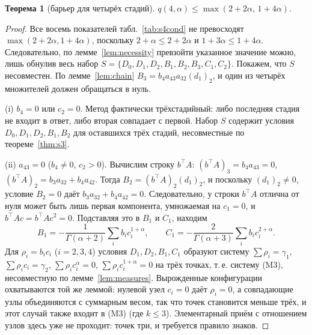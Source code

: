 \documentclass[11pt,a4paper]{article}
\theoremstyle{plain}
\newtheorem{theorem}{Теорема}
\theoremstyle{definition}
\newcommand{\G}{\Gamma}
\begin{document}
\begin{theorem}[барьер для четырёх стадий]\label{thm:s4}
$q(4,\alpha)\le\max(2+2\alpha,\,1+4\alpha)$.
\end{theorem}
\begin{proof}
Все восемь показателей табл.~\ref{tab:s4cond} не превосходят $\max(2+2\alpha,1+4\alpha)$, поскольку $2+\alpha\le2+2\alpha$ и $1+3\alpha\le1+4\alpha$. Следовательно, по лемме~\ref{lem:necessity} превзойти указанное значение можно, лишь обнулив весь набор $S=\{D_0,D_1,D_2,B_1,B_2,B_3,C_1,C_2\}$. Покажем, что $S$ несовместен. По лемме~\ref{lem:chain} $B_3=b_4a_{43}a_{32}(d_1)_2$, и один из четырёх множителей должен обращаться в нуль.

(i) $b_4=0$ или $c_2=0$. Метод фактически трёхстадийный: либо последняя стадия не входит в ответ, либо вторая совпадает с первой. Набор $S$ содержит условия $D_0,D_1,D_2,B_1,B_2$ для оставшихся трёх стадий, несовместные по теореме~\ref{thm:s3}.

(ii) $a_{43}=0$ ($b_4\ne0$, $c_2>0$). Вычислим строку $b^{\top}A$: $(b^{\top}A)_3=b_4a_{43}=0$, $(b^{\top}A)_2=b_3a_{32}+b_4a_{42}$. Тогда $B_2=(b^{\top}A)_2(d_1)_2$, и поскольку $(d_1)_2\neq0$, условие $B_2=0$ даёт $b_3a_{32}+b_4a_{42}=0$. Следовательно, у строки $b^{\top}A$ отлична от нуля может быть лишь первая компонента, умножаемая на $c_1=0$, и $b^{\top}Ac=b^{\top}Ac^2=0$. Подставляя это в $B_1$ и $C_1$, находим
\[
B_1=-\frac{1}{\G(\alpha+2)}\sum_ib_ic_i^{1+\alpha},\qquad C_1=-\frac{2}{\G(\alpha+3)}\sum_ib_ic_i^{2+\alpha}.
\]
Для $\rho_i=b_ic_i$ ($i=2,3,4$) условия $D_1,D_2,B_1,C_1$ образуют систему $\sum\rho_i=\gamma_1$, $\sum\rho_ic_i=\gamma_2$, $\sum\rho_ic_i^{\alpha}=0$, $\sum\rho_ic_i^{1+\alpha}=0$ на трёх точках, т.\,е. систему (M3), несовместную по лемме~\ref{lem:measures}. Вырожденные конфигурации охватываются той же леммой: нулевой узел $c_i=0$ даёт $\rho_i=0$, а совпадающие узлы объединяются с суммарным весом, так что точек становится меньше трёх, и этот случай также входит в (M3) (где $k\le3$). Элементарный приём с отношением узлов здесь уже не проходит: точек три, и требуется правило знаков.


\end{proof}
\end{document}

